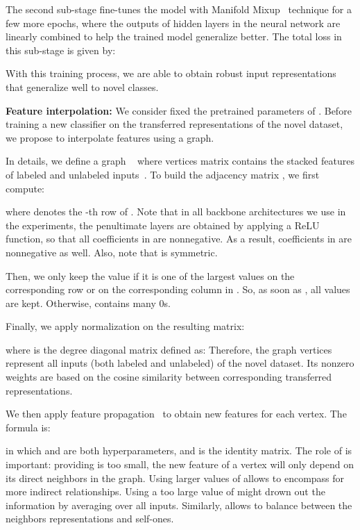 \documentclass[a4paper,conference]{IEEEtran}
\begin{document}
The second sub-stage fine-tunes the model with Manifold Mixup~\cite{verma2018manifold} technique for a few more epochs, where the outputs of hidden layers in the neural network are linearly combined to help the trained model generalize better. The total loss in this sub-stage is given by:

With this training process, we are able to obtain robust input representations that generalize well to novel classes.

\textbf{Feature interpolation:} We consider fixed the pretrained parameters  of . Before training a new classifier  on the transferred representations of the novel dataset, we propose to interpolate features using a graph.

In details, we define a graph ~\cite{kipf2016semi} where vertices matrix  contains the stacked features of labeled and unlabeled inputs~\cite{garcia2017few}. To build the adjacency matrix , we first compute:

where  denotes the -th row of . Note that in all backbone architectures we use in the experiments, the penultimate layers are obtained by applying a ReLU function, so that all coefficients in  are nonnegative. As a result, coefficients in  are nonnegative as well. Also, note that  is symmetric.

Then, we only keep the value  if it is one of the  largest values on the corresponding row or on the corresponding column in . So, as soon as , all values are kept. Otherwise,  contains many 0s.

Finally, we apply normalization on the resulting matrix: 

where  is the degree diagonal matrix defined as: 
Therefore, the graph vertices represent all inputs (both labeled and unlabeled) of the novel dataset. Its nonzero weights are based on the cosine similarity between corresponding transferred representations.

We then apply feature propagation~\cite{wu2019simplifying} to obtain new features for each vertex. The formula is:

in which  and  are both hyperparameters, and  is the identity matrix. The role of  is important: providing  is too small, the new feature of a vertex will only depend on its direct neighbors in the graph. Using larger values of  allows to encompass for more indirect relationships. Using a too large value of  might drown out the information by averaging over all inputs. Similarly,  allows to balance between the neighbors representations and self-ones.
\end{document}
